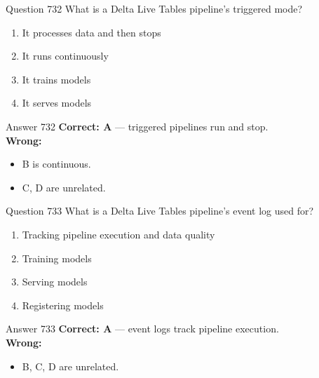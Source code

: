 \documentclass[aspectratio=169,11pt]{beamer}
\begin{document}
	\begin{frame}{Question 732}
		What is a Delta Live Tables pipeline's triggered mode?
		\begin{enumerate}[label=\Alph*.]
			\item It processes data and then stops
			\item It runs continuously
			\item It trains models
			\item It serves models
		\end{enumerate}
	\end{frame}
	\begin{frame}{Answer 732}
		\textbf{Correct: A} --- triggered pipelines run and stop.\\
		\vspace{0.5em}
		\textbf{Wrong:}
		\begin{itemize}
			\item B is continuous.
			\item C, D are unrelated.
		\end{itemize}
	\end{frame}
	
	\begin{frame}{Question 733}
		What is a Delta Live Tables pipeline's event log used for?
		\begin{enumerate}[label=\Alph*.]
			\item Tracking pipeline execution and data quality
			\item Training models
			\item Serving models
			\item Registering models
		\end{enumerate}
	\end{frame}
	\begin{frame}{Answer 733}
		\textbf{Correct: A} --- event logs track pipeline execution.\\
		\vspace{0.5em}
		\textbf{Wrong:}
		\begin{itemize}
			\item B, C, D are unrelated.
		\end{itemize}
	\end{frame}
	
\end{document}
